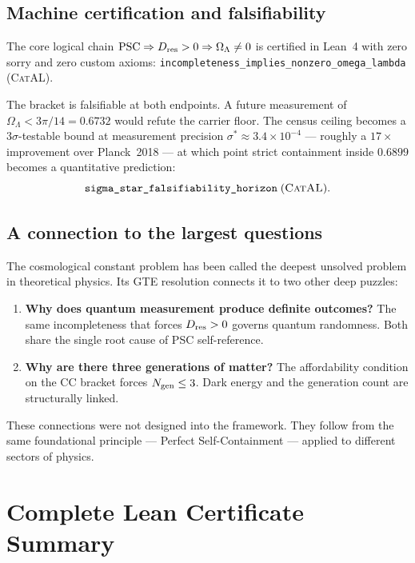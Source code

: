 \documentclass[11pt,a4paper]{article}
\newcommand{\lean}[1]{\texttt{#1}}
\newcommand{\OmL}{\Omega_\Lambda}
\newcommand{\Dres}{D_{\rm res}}
\newcommand{\Ngen}{N_{\rm gen}}
\newcommand{\CatAL}{\textsc{CatAL}}
\begin{document}
\subsection{Machine certification and falsifiability}

The core logical chain
$\text{PSC} \Rightarrow \Dres > 0 \Rightarrow \OmL \neq 0$
is certified in Lean~4 with zero sorry and zero custom axioms:
\lean{incompleteness\_implies\_nonzero\_omega\_lambda} (\CatAL).

The bracket is falsifiable at both endpoints.  A future measurement of
$\OmL < 3\pi/14 = 0.6732$ would refute the carrier floor.  The census ceiling
becomes a $3\sigma$-testable bound at measurement precision
$\sigma^* \approx 3.4 \times 10^{-4}$ --- roughly a
$17\times$ improvement over Planck~2018 --- at which point strict containment
inside $0.6899$ becomes a quantitative prediction:
\[\lean{sigma\_star\_falsifiability\_horizon} \;(\CatAL).\]

\subsection{A connection to the largest questions}

The cosmological constant problem has been called the deepest unsolved problem
in theoretical physics.  Its GTE resolution connects it to two other deep
puzzles:
\begin{enumerate}[itemsep=4pt]
  \item \textbf{Why does quantum measurement produce definite outcomes?}  
    The same incompleteness that forces $\Dres > 0$ governs quantum
    randomness.  Both share the single root cause of PSC self-reference.
  \item \textbf{Why are there three generations of matter?}
    The affordability condition on the CC bracket forces $\Ngen \leq 3$.
    Dark energy and the generation count are structurally linked.
\end{enumerate}

These connections were not designed into the framework.  They follow from the
same foundational principle --- Perfect Self-Containment --- applied to
different sectors of physics.

\section{Complete Lean Certificate Summary}
\label{sec:lean}
\end{document}
